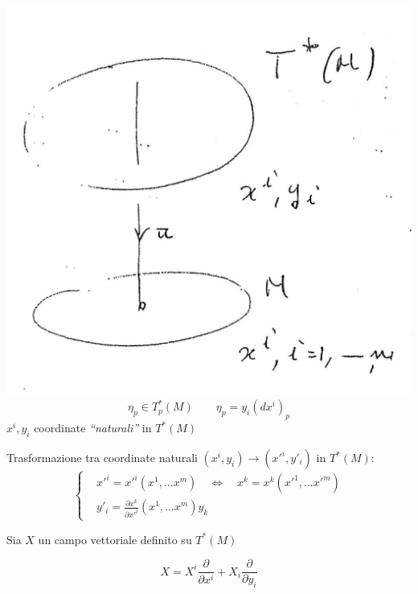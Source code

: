 \begin{multicols}{2}
\includegraphics[width=\columnwidth]{media/struttura-simplettica-del-fibrato-cotangente/21-1.jpeg}
\bigskip
\bigskip
\begin{equation*}
\eta_p \in T_p^* (M) \qquad \eta_p = y_i (dx^i)_p 
\end{equation*}
$ x^i, y_i $ coordinate \textit{``naturali''} in $T^*(M)$
\end{multicols}

Trasformazione tra coordinate naturali $ (x^i, y_i) \rightarrow (x'^i, y'_i) $ in $ T^* (M) $: 
\begin{equation*}
\left \{
\begin{aligned}
&x'^i = x'^i(x^1, \dots x^m) \quad \Leftrightarrow \quad x^k = x^k(x'^1, \dots x'^m) \\
&y'_i = \frac{\partial x^k}{\partial x'^i} (x^1, \dots x^m)y_k 
\end{aligned}
\right.
\end{equation*}

Sia $ X $ un campo vettoriale definito su $ T^* (M) $

\begin{equation*}
X = X^i \frac{\partial}{\partial x^i} + X_i\frac{\partial}{\partial y_i}
\end{equation*}

